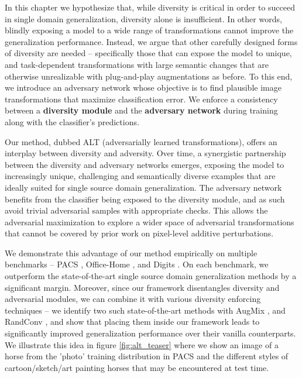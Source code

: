 In this chapter we hypothesize that, while diversity is critical in order to succeed in single domain generalization, diversity alone is insufficient. 
In other words, blindly exposing a model to a wide range of transformations cannot improve the generalization performance. Instead, we argue that other carefully designed forms of diversity are needed -- specifically those that can expose the model to unique, and task-dependent transformations with large semantic changes that are otherwise unrealizable with plug-and-play augmentations as before.  To this end, we introduce an adversary network whose objective is to find plausible image transformations that maximize classification error. We enforce a consistency between a \textbf{diversity module} and the \textbf{adversary network} during training along with the classifier's predictions. 

Our method, dubbed ALT (adversarially learned transformations), offers an interplay between diversity and adversity. Over time, a synergistic partnership between the diversity and adversary networks emerges, exposing the model to increasingly unique, challenging and semantically diverse examples that are ideally suited for single source domain generalization.  The adversary network benefits from the classifier being exposed to the diversity module, and as such avoid trivial adversarial samples with appropriate checks. This allows the adversarial maximization to explore a wider space of adversarial transformations that cannot be covered by prior work on pixel-level additive perturbations.
  
We demonstrate this advantage of our method empirically on multiple benchmarks -- PACS \citep{li2017deeper}, Office-Home \citep{venkateswara2017deep}, and Digits \citep{volpi2018generalizing}. On each benchmark, we outperform the state-of-the-art single source domain generalization methods by a significant margin.  Moreover, since our framework disentangles diversity and adversarial modules, we can combine it with various diversity enforcing techniques -- we identify two such state-of-the-art methods with AugMix \citep{hendrycks2019augmix}, and RandConv \citep{xu2020robust}, and show that placing them inside our framework leads to significantly improved generalization performance over their vanilla counterparts. 
We illustrate this idea in figure \ref{fig:alt_teaser} where we show an image of a horse from the 'photo' training distribution in PACS and the different styles of cartoon/sketch/art painting horses that may be encountered at test time. 

